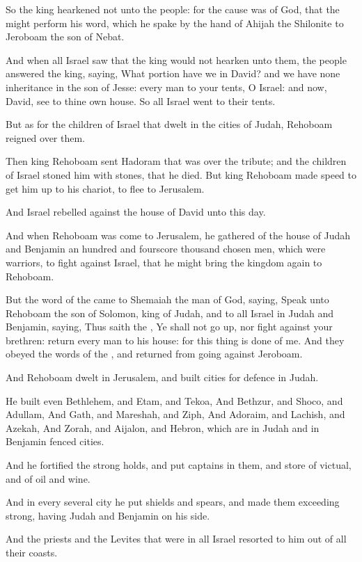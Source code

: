 \Verse So the king hearkened not unto the people: for the cause was of God, that the \LORD might perform his word, which he spake by the hand of Ahijah the Shilonite to Jeroboam the son of Nebat.

\Verse And when all Israel saw that the king would not hearken unto them, the people answered the king, saying, What portion have we in David?  and we have none inheritance in the son of Jesse: every man to your tents, O Israel: and now, David, see to thine own house. So all Israel went to their tents.

\Verse But as for the children of Israel that dwelt in the cities of Judah, Rehoboam reigned over them.

\Verse Then king Rehoboam sent Hadoram that was over the tribute; and the children of Israel stoned him with stones, that he died. But king Rehoboam made speed to get him up to his chariot, to flee to Jerusalem.

\Verse And Israel rebelled against the house of David unto this day.


\Chapter
\Verse And when Rehoboam was come to Jerusalem, he gathered of the house of Judah and Benjamin an hundred and fourscore thousand chosen men, which were warriors, to fight against Israel, that he might bring the kingdom again to Rehoboam.

\Verse But the word of the \LORD came to Shemaiah the man of God, saying, \Verse Speak unto Rehoboam the son of Solomon, king of Judah, and to all Israel in Judah and Benjamin, saying, \Verse Thus saith the \LORD, Ye shall not go up, nor fight against your brethren: return every man to his house: for this thing is done of me. And they obeyed the words of the \LORD, and returned from going against Jeroboam.

\Verse And Rehoboam dwelt in Jerusalem, and built cities for defence in Judah.

\Verse He built even Bethlehem, and Etam, and Tekoa, \Verse And Bethzur, and Shoco, and Adullam, \Verse And Gath, and Mareshah, and Ziph, \Verse And Adoraim, and Lachish, and Azekah, \Verse And Zorah, and Aijalon, and Hebron, which are in Judah and in Benjamin fenced cities.

\Verse And he fortified the strong holds, and put captains in them, and store of victual, and of oil and wine.

\Verse And in every several city he put shields and spears, and made them exceeding strong, having Judah and Benjamin on his side.

\Verse And the priests and the Levites that were in all Israel resorted to him out of all their coasts.

